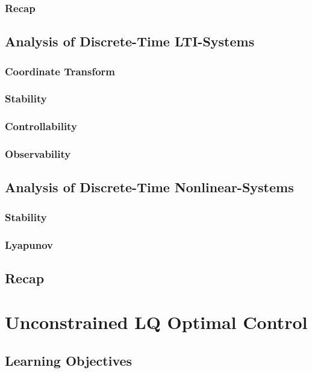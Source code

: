 \subsubsection{Recap}

\subsection{Analysis of Discrete-Time LTI-Systems}

\subsubsection{Coordinate Transform}
\subsubsection{Stability}
\subsubsection{Controllability}
\subsubsection{Observability}

\subsection{Analysis of Discrete-Time Nonlinear-Systems}
\subsubsection{Stability}
\subsubsection{Lyapunov}

\subsection{Recap}

\section{Unconstrained LQ Optimal Control}

\subsection{Learning Objectives}

